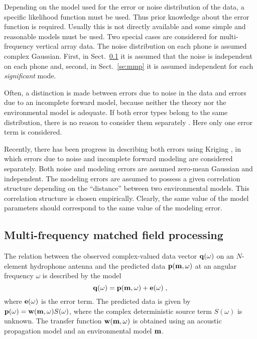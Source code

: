 \documentclass{saclantc}
\begin{document}
%
\label{se:like}

Depending on the model  used for the error or
noise distribution of the data, a specific likelihood function must 
be used. Thus prior knowledge about the error function is
required.
Usually this is not directly available and some simple and reasonable
models must be used. Two special cases are considered for
multi-frequency  vertical array data. The noise distribution on each
phone is assumed complex Gaussian.
First, in Sect.\ \ref{se:mfp} it is assumed that the
noise is independent on each phone and, second, in 
Sect.\ \ref{se:mmp} it is assumed independent 
for each {\it significant} mode. 

Often, a distinction is made between errors due to noise in the data
and errors due to an incomplete forward model,  because neither the
theory  nor the environmental model is  adequate.
If both error types belong to the same distribution, there is
no reason to consider them separately \cite{duijndam:gp88}. 
Here only one error term is considered.

Recently, there has been  progress in describing both errors using 
Kriging  \cite{Lefebvre96}, in which 
 errors due to noise and incomplete forward
modeling are considered separately. 
Both noise and modeling errors are assumed
zero-mean Gaussian and independent.
The modeling errors are assumed to possess a given correlation structure
depending on the ``distance'' between two  environmental models. 
This correlation structure is chosen empirically.
Clearly,  the same value of the model parameters should
correspond to the same value of the modeling error.

\subsection{Multi-frequency matched field processing}
\label{se:mfp}

The relation between the observed complex-valued data vector ${\bf q}(\omega)$ 
on an $N$-element hydrophone antenna and the predicted data
${\bf p}({\bf m}, \omega)$ at an angular frequency $\omega $ 
is described by the model
\begin{equation}
 {\bf q}(\omega) = {\bf p}( {\bf m}, \omega )+ {\bf e}(\omega)\;,
\end{equation}
where $ {\bf e}(\omega)$ is  the error term. The predicted data is
given by ${\bf p}(\omega )= {\bf w}( {\bf m}, \omega)S(\omega) $, where the
complex deterministic source term $S(\omega)$ is unknown.  The
transfer function $ {\bf w}( {\bf m}, \omega)$ 
is obtained using an acoustic propagation model and
an environmental model $\bf m $.
\end{document}

